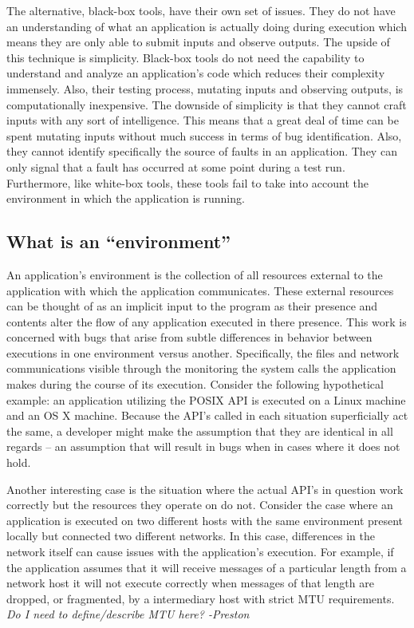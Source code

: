     The alternative, black-box tools, have their own set of issues. They do not have an understanding of what an
    application is actually doing during execution which means they are only able to submit inputs and observe
    outputs.  The upside of this technique is simplicity. Black-box tools do not need the capability to understand
    and analyze an application's code which reduces their complexity immensely. Also, their testing process,
    mutating inputs and observing outputs, is computationally inexpensive. The downside of simplicity is that they
    cannot craft inputs with any sort of intelligence. This means that a great deal of time can be spent mutating
    inputs without much success in terms of bug identification. Also, they cannot identify specifically the source
    of faults in an application. They can only signal that a fault has occurred at some point during a test run.
    Furthermore, like white-box tools, these tools fail to take into account the environment in which the
    application is running.


    \subsection{What is an ``environment''}

    An application's environment is the collection of all resources external to the application with which the
    application communicates.  These external resources can be thought of as an implicit input to the program as their
    presence and contents alter the flow of any application executed in there presence.  This work is concerned with bugs
    that arise from subtle differences in behavior between executions in one environment versus another. Specifically, the
    files and network communications visible through the monitoring the system calls the application makes during the course
    of its execution.  Consider the following hypothetical example: an application utilizing the POSIX API is executed on a
    Linux machine and an OS X machine.  Because the API's called in each situation superficially act the same, a developer might
    make the assumption that they are identical in all regards -- an assumption that will result in bugs when in cases where
    it does not hold.

    Another interesting case is the situation where the actual API's in question work correctly but the resources they
    operate on do not.  Consider the case where an application is executed on two different hosts with the same environment
    present locally but connected two different networks.  In this case, differences in the network itself can cause issues
    with the application's execution.  For example, if the application assumes that it will receive messages of a particular
    length from a network host it will not execute correctly when messages of that length are dropped, or fragmented, by a
    intermediary host with strict MTU requirements. \emph{Do I need to define/describe MTU here? -Preston}


